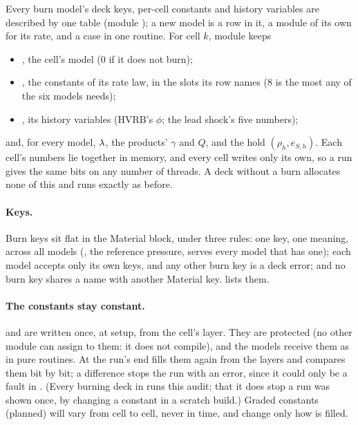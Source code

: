 Every burn model's deck keys, per-cell constants and history variables are
described by one table (module ); a new model is a row in
it, a module of its own for its rate, and a case in one routine. For cell
$k$, module  keeps
\begin{itemize}
\item {}, the cell's model (0 if it does not burn);
\item {}, the constants of its rate law, in the slots its
  row names (8 is the most any of the six models needs);
\item {}, its history variables (HVRB's $\phi$; the lead
  shock's five numbers);
\end{itemize}
and, for every model, $\lambda$, the products' $\gamma$ and $Q$, and the hold
$(\rho_h, e_{S,h})$. Each cell's numbers lie together in memory, and every
cell writes only its own, so a run gives the same bits on any number of
threads. A deck without a burn allocates none of this and runs exactly as
before.

\paragraph{Keys.} Burn keys sit flat in the Material block, under three
rules: one key, one meaning, across all models (, the reference
pressure, serves every model that has one); each model accepts only its own
keys, and any other burn key is a deck error; and no burn key shares a name
with another Material key.  lists them.

\paragraph{The constants stay constant.}  and  are
written once, at setup, from the cell's layer. They are protected (no other
module can assign to them: it does not compile), and the models receive them
as  in pure routines. At the run's end 
fills them again from the layers and compares them bit by bit; a difference
stops the run with an error, since it could only be a fault in \bw. (Every
burning deck in  runs this audit; that it does stop a run was
shown once, by changing a constant in a scratch build.) Graded
constants (planned) will vary from cell to cell, never in time, and change
only how  is filled.

